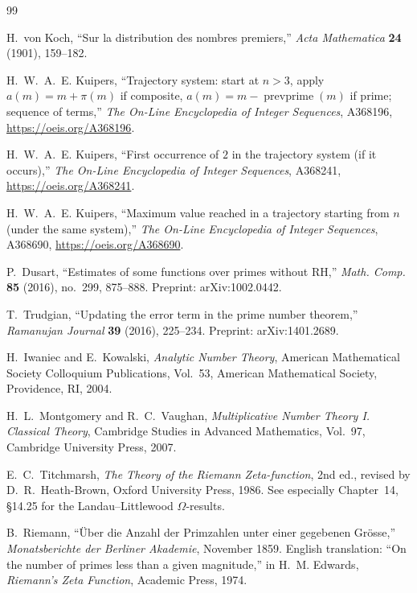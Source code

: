 \documentclass[11pt]{article}
\theoremstyle{plain}
\theoremstyle{definition}
\theoremstyle{remark}
\begin{document}
\begin{thebibliography}{99}

H.~von Koch,
``Sur la distribution des nombres premiers,''
\emph{Acta Mathematica} \textbf{24} (1901), 159--182.

H.~W.~A.~E. Kuipers,
\newblock ``Trajectory system: start at $n>3$, apply $a(m)=m+\pi(m)$ if composite, $a(m)=m-\operatorname{prevprime}(m)$ if prime; sequence of terms,'' 
\newblock \emph{The On-Line Encyclopedia of Integer Sequences}, A368196, \url{https://oeis.org/A368196}.

H.~W.~A.~E. Kuipers,
\newblock ``First occurrence of $2$ in the trajectory system (if it occurs),'' 
\newblock \emph{The On-Line Encyclopedia of Integer Sequences}, A368241, \url{https://oeis.org/A368241}.

H.~W.~A.~E. Kuipers,
\newblock ``Maximum value reached in a trajectory starting from $n$ (under the same system),'' 
\newblock \emph{The On-Line Encyclopedia of Integer Sequences}, A368690, \url{https://oeis.org/A368690}.

P.~Dusart,
``Estimates of some functions over primes without RH,''
\emph{Math. Comp.} \textbf{85} (2016), no.~299, 875--888.
Preprint: arXiv:1002.0442.

T.~Trudgian,
\newblock ``Updating the error term in the prime number theorem,'' 
\newblock \emph{Ramanujan Journal} \textbf{39} (2016), 225–234. 
\newblock Preprint: arXiv:1401.2689.

H.~Iwaniec and E.~Kowalski,
\emph{Analytic Number Theory},
American Mathematical Society Colloquium Publications, Vol.~53,
American Mathematical Society, Providence, RI, 2004.

H.~L.~Montgomery and R.~C.~Vaughan,
\emph{Multiplicative Number Theory I. Classical Theory},
Cambridge Studies in Advanced Mathematics, Vol.~97,
Cambridge University Press, 2007.

E.~C.~Titchmarsh, \emph{The Theory of the Riemann Zeta-function}, 
2nd ed., revised by D.~R.~Heath-Brown, Oxford University Press, 1986. 
See especially Chapter~14, §14.25 for the Landau--Littlewood $\Omega$-results.

B.~Riemann,
\newblock ``Über die Anzahl der Primzahlen unter einer gegebenen Grösse,'' 
\newblock \emph{Monatsberichte der Berliner Akademie}, November 1859. 
English translation: ``On the number of primes less than a given magnitude,'' in H.~M. Edwards, \emph{Riemann’s Zeta Function}, Academic Press, 1974.


\end{thebibliography}
\end{document}
